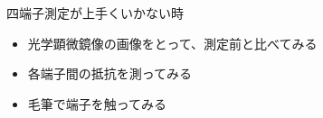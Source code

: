 \documentclass[11pt,a4paper]{jsarticle}
\begin{document}
四端子測定が上手くいかない時
\begin{itemize}
\item 光学顕微鏡像の画像をとって、測定前と比べてみる
\item 各端子間の抵抗を測ってみる
\item 毛筆で端子を触ってみる
\end{itemize}

\end{document}
